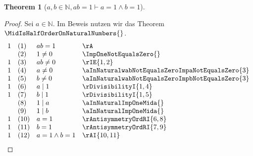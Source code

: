 \documentclass{book}
\theoremstyle{plain}
\newtheorem{theorem}{Theorem}
\theoremstyle{remark}
\theoremstyle{definition}
\begin{document}
\label{awbInNaturalwabEqualsOneImpaEqualsOneAndbEqualsOne}
\begin{theorem}[\(a,b\in\mathbb{N},ab=1\vdash a=1\land b=1\)]
\end{theorem}
\begin{proof}
Sei \(a\in\mathbb{N}\).
Im Beweis nutzen wir das Theorem \(\MidIsHalfOrderOnNaturalNumbers{}\). 
    \[
	\begin{array}{llclll}
        1       &  (1)  & \multicolumn{3}{l}{ab=1} & \rA \\
                &  (2)  & \multicolumn{3}{l}{1\neq 0} & \ImpOneNotEqualsZero{} \\
        1       &  (3)  & \multicolumn{3}{l}{ab\neq 0} & \rIE{1,2} \\
        1       &  (4)  & \multicolumn{3}{l}{a\neq 0} & \aInNaturalwabNotEqualsZeroImpaNotEqualsZero{3} \\
        1       &  (5)  & \multicolumn{3}{l}{b\neq 0} & \aInNaturalwabNotEqualsZeroImpbNotEqualsZero{3} \\
        1       &  (6)  & \multicolumn{3}{l}{a\mid 1} & \rDivisibilityI{1,4} \\
        1       &  (7)  & \multicolumn{3}{l}{b\mid 1} & \rDivisibilityI{1,5} \\
                &  (8)  & \multicolumn{3}{l}{1\mid a} & \aInNaturalImpOneMida{} \\
                &  (9)  & \multicolumn{3}{l}{1\mid b} & \aInNaturalImpOneMida{} \\
        1       &  (10)  & \multicolumn{3}{l}{a=1} & \rAntisymmetryOrdRI{6,8} \\
        1       &  (11)  & \multicolumn{3}{l}{b=1} & \rAntisymmetryOrdRI{7,9} \\
        1       &  (12)  & \multicolumn{3}{l}{a=1\land b=1} & \rAI{10,11} \\
        \end{array}
    \]
\end{proof}
\end{document}
